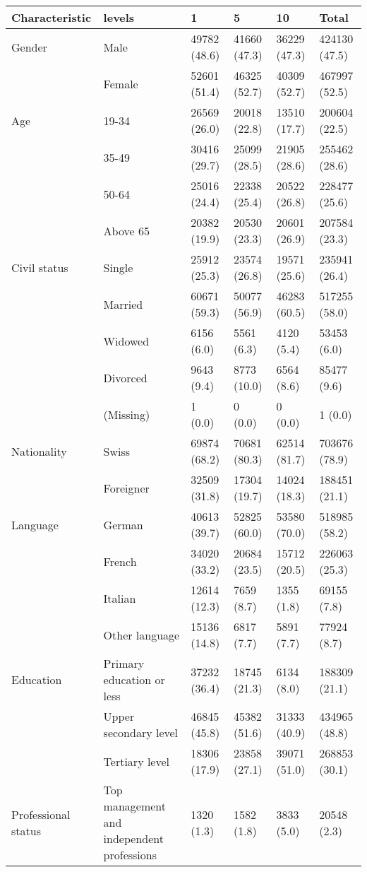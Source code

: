 
\begin{tabular}{llllll}
\toprule
Characteristic & levels & 1 & 5 & 10 & Total\\
\midrule
Gender & Male & 49782 (48.6) & 41660 (47.3) & 36229 (47.3) & 424130 (47.5)\\
 & Female & 52601 (51.4) & 46325 (52.7) & 40309 (52.7) & 467997 (52.5)\\
\addlinespace
Age & 19-34 & 26569 (26.0) & 20018 (22.8) & 13510 (17.7) & 200604 (22.5)\\
 & 35-49 & 30416 (29.7) & 25099 (28.5) & 21905 (28.6) & 255462 (28.6)\\
 & 50-64 & 25016 (24.4) & 22338 (25.4) & 20522 (26.8) & 228477 (25.6)\\
 & Above 65 & 20382 (19.9) & 20530 (23.3) & 20601 (26.9) & 207584 (23.3)\\
\addlinespace
Civil status & Single & 25912 (25.3) & 23574 (26.8) & 19571 (25.6) & 235941 (26.4)\\
 & Married & 60671 (59.3) & 50077 (56.9) & 46283 (60.5) & 517255 (58.0)\\
 & Widowed & 6156 (6.0) & 5561 (6.3) & 4120 (5.4) & 53453 (6.0)\\
 & Divorced & 9643 (9.4) & 8773 (10.0) & 6564 (8.6) & 85477 (9.6)\\
 & (Missing) & 1 (0.0) & 0 (0.0) & 0 (0.0) & 1 (0.0)\\
\addlinespace
Nationality & Swiss & 69874 (68.2) & 70681 (80.3) & 62514 (81.7) & 703676 (78.9)\\
 & Foreigner & 32509 (31.8) & 17304 (19.7) & 14024 (18.3) & 188451 (21.1)\\
\addlinespace
Language & German & 40613 (39.7) & 52825 (60.0) & 53580 (70.0) & 518985 (58.2)\\
 & French & 34020 (33.2) & 20684 (23.5) & 15712 (20.5) & 226063 (25.3)\\
 & Italian & 12614 (12.3) & 7659 (8.7) & 1355 (1.8) & 69155 (7.8)\\
 & Other language & 15136 (14.8) & 6817 (7.7) & 5891 (7.7) & 77924 (8.7)\\
\addlinespace
Education & Primary education or less & 37232 (36.4) & 18745 (21.3) & 6134 (8.0) & 188309 (21.1)\\
 & Upper secondary level & 46845 (45.8) & 45382 (51.6) & 31333 (40.9) & 434965 (48.8)\\
 & Tertiary level & 18306 (17.9) & 23858 (27.1) & 39071 (51.0) & 268853 (30.1)\\
Professional status & Top management and independent professions & 1320 (1.3) & 1582 (1.8) & 3833 (5.0) & 20548 (2.3)\\

\end{tabular}
